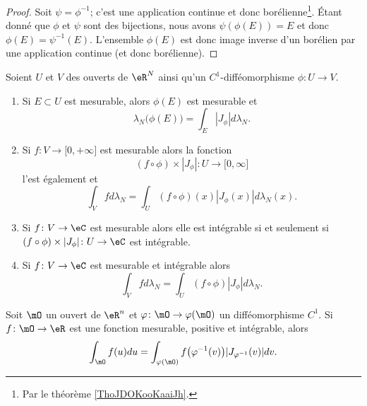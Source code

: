 \begin{proof}
    Soit \( \psi=\phi^{-1}\); c'est une application continue et donc borélienne\footnote{Par le théorème \ref{ThoJDOKooKaaiJh}.}. Étant donné que \( \phi\) et \( \psi\) sont des bijections, nous avons \( \psi(\phi(E))=E\) et donc \( \phi(E)=\psi^{-1}(E)\). L'ensemble \( \phi(E)\) est donc image inverse d'un borélien par une application continue (et donc borélienne).
\end{proof}

\begin{theorem}
    Soient \( U\) et \( V\) des ouverts de \( \eR^N\) ainsi qu'un \( C^1\)-difféomorphisme \(\phi\colon U\to V\).
    \begin{enumerate}
        \item
            Si \( E\subset U\) est mesurable, alors \( \phi(E)\) est mesurable et
            \begin{equation}
                \lambda_N\big( \phi(E) \big)=\int_E| J_{\phi} |d\lambda_N.
            \end{equation}
        \item
            Si \( f\colon V\to \mathopen[ 0 , +\infty \mathclose]\) est mesurable alors la fonction
            \begin{equation}
                (f\circ\phi)\times | J_{\phi} |\colon U\to \mathopen[ 0 , \infty \mathclose]
            \end{equation}
            l'est également et
            \begin{equation}
                \int_Vfd\lambda_N=\int_U(f\circ\phi)(x)| J_{\phi}(x) |d\lambda_N(x).
            \end{equation}
        \item
            Si \( f\colon V\to \eC\) est mesurable alors elle est intégrable si et seulement si \( (f\circ \phi)\times | J_{\phi} |\colon U\to \eC\) est intégrable.

        \item

            Si \( f\colon V\to \eC\) est mesurable et intégrable alors
            \begin{equation}
                \int_Vfd\lambda_N=\int_U (f\circ \phi)| J_{\phi} |d\lambda_N.
            \end{equation}
    \end{enumerate}
\end{theorem}

\begin{theorem} \label{ThomFeRCi}
    Soit \( \mO\) un ouvert de \( \eR^n\) et \( \varphi\colon \mO\to \varphi(\mO)\) un difféomorphisme \( C^1\). Si \( f\colon \mO\to \eR\) est une fonction mesurable, positive et intégrable, alors
    \begin{equation}
        \int_{\mO}f(u)du=\int_{\varphi(\mO)}f\big( \varphi^{-1}(v) \big)| J_{\varphi^{-1}}(v) |dv.
    \end{equation}
\end{theorem}

